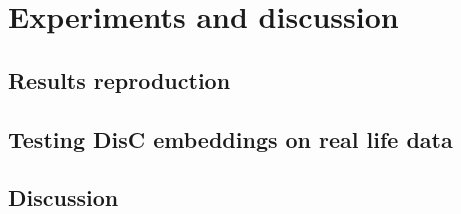 \documentclass{article}
\begin{document}
\newpage
\section{Experiments and discussion}

\subsection{Results reproduction}

\subsection{Testing DisC embeddings on real life data}


\subsection{Discussion}



 

\end{document}
